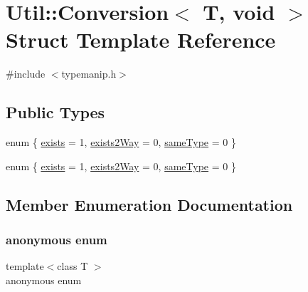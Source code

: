 \hypertarget{structUtil_1_1Conversion_3_01T_00_01void_01_4}{}\section{Util\+:\+:Conversion$<$ T, void $>$ Struct Template Reference}
\label{structUtil_1_1Conversion_3_01T_00_01void_01_4}


{\ttfamily \#include $<$typemanip.\+h$>$}

\subsection*{Public Types}
\begin{DoxyCompactItemize}
\item 
enum \{ \mbox{\hyperlink{structUtil_1_1Conversion_3_01T_00_01void_01_4_a4f74c2a48bdeb451354ab4eace6908f5abe46fa6f8757b0105eb5681c5ab0e0fd}{exists}} = 1, 
\mbox{\hyperlink{structUtil_1_1Conversion_3_01T_00_01void_01_4_a4f74c2a48bdeb451354ab4eace6908f5a4df0ad18c9bf2040ae6ab554174fe7f4}{exists2\+Way}} = 0, 
\mbox{\hyperlink{structUtil_1_1Conversion_3_01T_00_01void_01_4_a4f74c2a48bdeb451354ab4eace6908f5a9af8d89278860cc09d47edd6306a8b65}{same\+Type}} = 0
 \}
\item 
enum \{ \mbox{\hyperlink{structUtil_1_1Conversion_3_01T_00_01void_01_4_a4f74c2a48bdeb451354ab4eace6908f5abe46fa6f8757b0105eb5681c5ab0e0fd}{exists}} = 1, 
\mbox{\hyperlink{structUtil_1_1Conversion_3_01T_00_01void_01_4_a4f74c2a48bdeb451354ab4eace6908f5a4df0ad18c9bf2040ae6ab554174fe7f4}{exists2\+Way}} = 0, 
\mbox{\hyperlink{structUtil_1_1Conversion_3_01T_00_01void_01_4_a4f74c2a48bdeb451354ab4eace6908f5a9af8d89278860cc09d47edd6306a8b65}{same\+Type}} = 0
 \}
\end{DoxyCompactItemize}


\subsection{Member Enumeration Documentation}
\mbox{\label{structUtil_1_1Conversion_3_01T_00_01void_01_4_a5d15302ce24b3dcd75608429c916feb8}} 
\subsubsection{\texorpdfstring{anonymous enum}{anonymous enum}}
{\footnotesize\ttfamily template$<$class T $>$ \\
anonymous enum}

